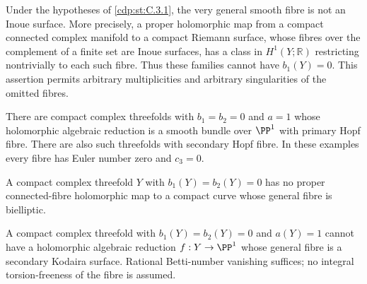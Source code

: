 \begin{proposition}\hypertarget{tag-01F7}{}\label{cdp:st:C.3.12}



Under the hypotheses of \ref{cdp:st:C.3.1}, the very general smooth fibre is
not an Inoue surface. More precisely, a proper holomorphic map from
a compact connected complex manifold to a compact Riemann surface,
whose fibres over the complement of a finite set are Inoue surfaces,
has a class in $H^1(Y;\mathbb R)$ restricting nontrivially to each
such fibre. Thus these families cannot have $b_1(Y)=0$.
This assertion permits arbitrary multiplicities and arbitrary
singularities of the omitted fibres.
\end{proposition}

\begin{proposition}\hypertarget{tag-01FC}{}\label{cdp:st:C.3.6}



There are compact complex threefolds with $b_1=b_2=0$ and $a=1$
whose holomorphic algebraic reduction is a smooth bundle over
$\PP^1$ with primary Hopf fibre. There are also such threefolds
with secondary Hopf fibre. In these examples every fibre has Euler
number zero and $c_3=0$.
\end{proposition}

\begin{proposition}\hypertarget{tag-01FD}{}\label{cdp:st:C.3.7}



A compact complex threefold $Y$ with $b_1(Y)=b_2(Y)=0$ has no
proper connected-fibre holomorphic map to a compact curve whose
general fibre is bielliptic.
\end{proposition}

\begin{proposition}\hypertarget{tag-01FF}{}\label{cdp:st:C.3.9}



A compact complex threefold with $b_1(Y)=b_2(Y)=0$ and
$a(Y)=1$ cannot have a holomorphic algebraic reduction
$f:Y\to\PP^1$ whose general fibre is a secondary Kodaira
surface. Rational Betti-number vanishing suffices; no integral
torsion-freeness of the fibre is assumed.
\end{proposition}

